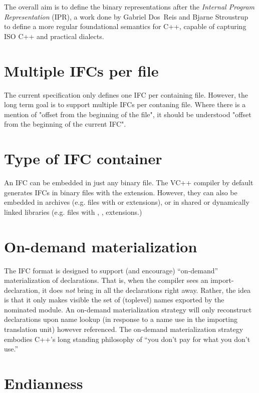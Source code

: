 \noindent
The overall aim is to define the binary representations after the 
\emph{Internal Program Representation} (IPR), a work done by Gabriel Dos~Reis
and Bjarne Stroustrup \cite{gdr-bs:ipr-macis-special-issue,ipr:web} to define a more regular 
foundational semantics for
C++, capable of capturing ISO C++ and practical dialects.

\section{Multiple IFCs per file}
\label{sec:ifc-multiple-ifcs-per-file}

The current specification only defines one IFC per containing file.  However, the long term goal is to support multiple IFCs per contaning file.
Where there is a mention of "offset from the beginning of the file", it should be understood "offset from the beginning of the current IFC".

\section{Type of IFC container}
\label{sec:ifc-type-of-ifc-container}

An IFC can be embedded in just any binary file.  The VC++ compiler by default generates IFCs in binary files with the 
 extension.  However, they can also be embedded in archives (e.g. files with  or  extensions), or
in shared or dynamically linked libraries (e.g. files with , ,  extensions.)

\section{On-demand materialization}

The IFC format is designed to support (and encourage) ``on-demand''
materialization of declarations.  That is, when the compiler sees an
import-declaration, it does \emph{not} bring in all the declarations
right away.  Rather, the idea is that it only makes visible
the set of (toplevel) names exported by the nominated module.  An
on-demand materialization strategy will only reconstruct declarations
upon name lookup (in response to a name use in the importing
translation unit) however referenced.  The on-demand materialization
strategy embodies C++'s long standing philosophy of ``you don't pay
for what you don't use.''

\section{Endianness}
\label{sec:ifc-endianness}

